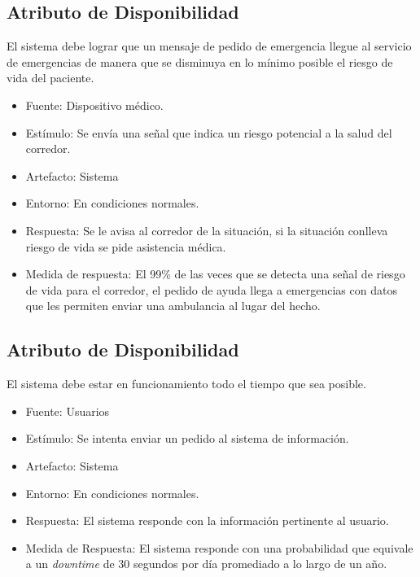 \subsection{Atributo de Disponibilidad}

El sistema debe lograr que un mensaje de pedido de emergencia llegue al
servicio de emergencias de manera que se disminuya en lo mínimo posible
el riesgo de vida del paciente.

\begin{itemize}
\itemsep1pt\parskip0pt
\item
  Fuente: Dispositivo médico.
\item
  Estímulo: Se envía una señal que indica un riesgo potencial a la salud
  del corredor.
\item
  Artefacto: Sistema
\item
  Entorno: En condiciones normales.
\item
  Respuesta: Se le avisa al corredor de la situación, si la situación
  conlleva riesgo de vida se pide asistencia médica.
\item
  Medida de respuesta: El 99\% de las veces que se detecta una señal de
  riesgo de vida para el corredor, el pedido de ayuda llega a
  emergencias con datos que les permiten enviar una ambulancia al lugar
  del hecho.
\end{itemize}

\subsection{Atributo de Disponibilidad}

El sistema debe estar en funcionamiento todo el tiempo que sea posible.

\begin{itemize}
\itemsep1pt\parskip0pt
\item
  Fuente: Usuarios
\item
  Estímulo: Se intenta enviar un pedido al sistema de información.
\item
  Artefacto: Sistema
\item
  Entorno: En condiciones normales.
\item
  Respuesta: El sistema responde con la información pertinente al
  usuario.
\item
  Medida de Respuesta: El sistema responde con una probabilidad que
  equivale a un \emph{downtime} de 30 segundos por día promediado a lo
  largo de un año.
\end{itemize}

